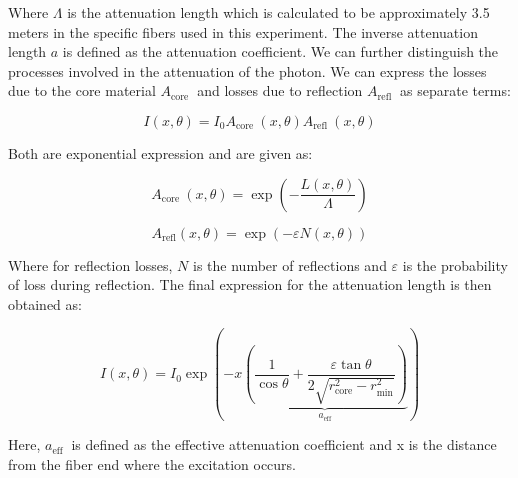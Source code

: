 Where $\Lambda$ is the attenuation length which is calculated to be approximately 3.5 meters in the specific fibers used in this experiment. The inverse attenuation length $a$ is defined as the attenuation coefficient. We can further distinguish the processes involved in the attenuation of the photon. We can express the losses due to the core material $A_{\text {core }}$ and losses due to reflection $A_{\text {refl }}$ as separate terms: 

\begin{equation}
I(x, \theta)=I_{0} A_{\text {core }}(x, \theta) A_{\text {refl }}(x, \theta)
\end{equation}

Both are exponential expression and are given as:

\begin{equation}
A_{\text {core }}(x, \theta)=\exp \left(-\frac{L(x, \theta)}{\Lambda}\right) 
\end{equation}

\begin{equation}
A_{\mathrm{refl}}(x, \theta)=\exp (-\varepsilon N(x, \theta)) 
\end{equation}

Where for reflection losses, $N$ is the number of reflections and $\varepsilon$ is the probability of loss during reflection. The final expression for the attenuation length is then obtained as:

\begin{equation}
\label{1.8}
I(x, \theta)=I_{0} \exp (-x \underbrace{\left(\frac{1}{\cos \theta}+\frac{\varepsilon \tan \theta}{2 \sqrt{r_{\mathrm{core}}^{2}-r_{\mathrm{min}}^{2}}}\right)}_{a_{\mathrm{eff}}})
\end{equation}

Here, $a_{\text {eff }}$ is defined as the effective attenuation coefficient and x is the distance from the fiber end where the excitation occurs.